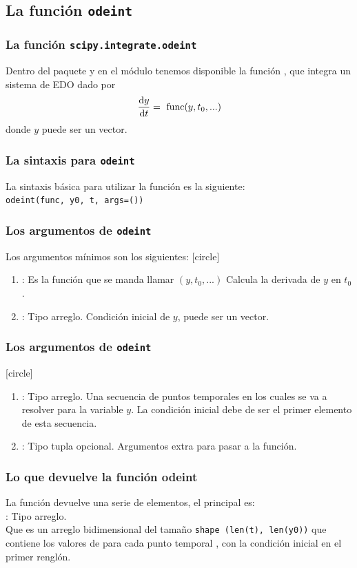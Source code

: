 \subsection{La función \texttt{odeint}}
\begin{frame}
\frametitle{La función \texttt{scipy.integrate.odeint}}
Dentro del paquete  y en el módulo  tenemos disponible la función , que integra un sistema de EDO dado por
\begin{align*}
\dv{y}{t} = \text{ func}(y, t_{0}, ...)
\end{align*}
donde $y$ puede ser un vector.
\end{frame}
\begin{frame}[fragile]
\frametitle{La sintaxis para \texttt{odeint}}
La sintaxis básica para utilizar la función es la siguiente:
\\
\bigskip
\verb|odeint(func, y0, t, args=())|
\end{frame}
\begin{frame}
\frametitle{Los argumentos de \texttt{odeint}}
Los argumentos mínimos son los siguientes:
[circle]
\begin{enumerate}[<+->]
\item {} : Es la función que se manda llamar $(y, t_{0}, ...)$ Calcula la derivada de $y$ en $t_{0}$.
\item {} : Tipo arreglo. Condición inicial de $y$, puede ser un vector.
\seti
\end{enumerate}
\end{frame}
\begin{frame}
\frametitle{Los argumentos de \texttt{odeint}}
[circle]
\begin{enumerate}[<+->]
\conti
\item {} : Tipo arreglo. Una secuencia de puntos temporales en los cuales se va a resolver para la variable $y$. La condición inicial debe de ser el primer elemento de esta secuencia.
\item {} : Tipo tupla opcional. Argumentos extra para pasar a la función.
\end{enumerate}
\end{frame}
\begin{frame}
\frametitle{Lo que devuelve la función \textbf{odeint}}
La función  devuelve una serie de elementos, el principal es:
\\
\medskip
{} : Tipo arreglo.
\\
\medskip
Que es un arreglo bidimensional del tamaño \texttt{shape (len(t), len(y0))} que contiene los valores de  para cada punto temporal , con la condición inicial  en el primer renglón.
\end{frame}
